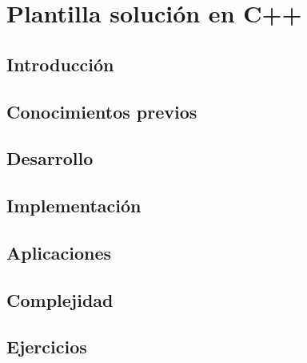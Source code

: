 \chapter{Plantilla solución en C++}
\section{Introducción}

\section{Conocimientos previos}

\section{Desarrollo}

\section{Implementación}

\section{Aplicaciones}

\section{Complejidad}

\section{Ejercicios}

%
